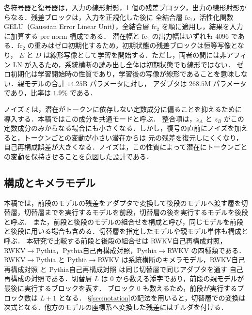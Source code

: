 \documentclass[techrep,noauthor]{ipsj}
\newcommand{\RWKVself}{RWKV自己再構成対照}
\newcommand{\Pythiaself}{Pythia自己再構成対照}
\newcommand{\RtoP}{RWKV$\to$\allowbreak Pythia}
\newcommand{\PtoR}{Pythia$\to$\allowbreak RWKV}
\begin{document}
各符号器と復号器は，入力の線形射影，1 個の残差ブロック，出力の線形射影からなる．残差ブロックは，入力を正規化した後に
全結合層 $\mathrm{fc}_1$，活性化関数 GELU（Gaussian Error Linear Unit），全結合層 $\mathrm{fc}_2$ を順に適用し，結果を入力に加算する pre-norm 構成である．
潜在幅と $\mathrm{fc}_1$ の出力幅はいずれも $4096$ である．$\mathrm{fc}_2$ の重みはゼロ初期化するため，初期状態の残差ブロックは恒等写像となり，
$E$ と $D$ は線形写像として学習を開始する．ただし，両者の間には非アフィン LN が入るため，系統横断の読み出し全体は初期状態でも線形ではない．
ゼロ初期化は学習開始時の性質であり，学習後の写像が線形であることを意味しない．親モデルの合計 $14.25$B パラメータに対し，
アダプタは $268.5$M パラメータであり，比率は $1.9\%$ である．

ノイズ $\xi$ は，潜在がトークンに依存しない定数成分に偏ることを抑えるために導入する．本稿ではこの成分を共通モードと呼ぶ．
整合項は，$z_A$ と $z_B$ がこの定数成分のみからなる場合にも小さくなる．しかし，復号の直前にノイズを加えると，トークンごとの変動が小さい潜在からは
元の残差を復元しにくくなり，自己再構成誤差が大きくなる．ノイズは，この性質によって潜在にトークンごとの変動を保持させることを意図した設計である．

\subsection{構成とキメラモデル}\label{sec:config}
本稿では，前段のモデルの残差をアダプタで変換して後段のモデルへ渡す層を切替層，切替層までを実行するモデルを前段，切替層の後を実行するモデルを後段と呼ぶ．
また，前段と後段のモデルの組合せを構成と呼び，同じモデルを前段と後段に用いる場合も含める．切替層を指定したモデルや親モデル単体も構成と呼ぶ．
本研究で比較する前段と後段の組合せは \RWKVself{}，\RtoP{}，\Pythiaself{}，\PtoR{} の四種類である．
\RtoP{} と \PtoR{} は系統横断のキメラモデル，\RWKVself{} と \Pythiaself{} は同じ切替層で同じアダプタを通す
自己再構成の対照である．切替層 $L$ は $0$ から数える添字であり，前段の親モデルが最後に実行するブロックを表す．
ブロック $0$ も数えるため，前段が実行するブロック数は $L{+}1$ となる．
\S\ref{sec:notation}の記法を用いると，切替層での変換は次式となる．他方のモデルの座標系へ変換した残差にはチルダを付ける．
\end{document}
